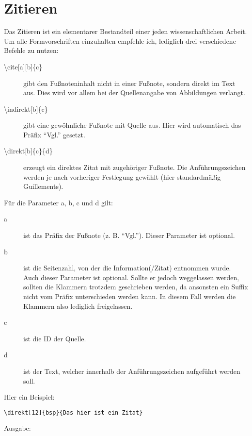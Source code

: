 
\chapter{Zitieren}\label{ch:zitieren}

Das Zitieren ist ein elementarer Bestandteil einer jeden wissenschaftlichen Arbeit. 
Um alle Formvorschriften einzuhalten empfehle ich, lediglich drei verschiedene Befehle zu nutzen:

\begin{description}
	\item[{\textbackslash cite[a][b]\{c\}}] gibt den Fußnoteninhalt nicht in einer Fußnote, sondern direkt im Text aus. Dies wird vor allem bei der Quellenangabe von Abbildungen verlangt.
	\item[{\textbackslash indirekt[b]\{c\}}] gibt eine gewöhnliche Fußnote mit Quelle aus. Hier wird automatisch das Präfix \enquote{Vgl.} gesetzt.
	\item[{\textbackslash direkt[b]\{c\}\{d\}}] erzeugt ein direktes Zitat mit zugehöriger Fußnote. Die Anführungszeichen werden je nach vorheriger Festlegung gewählt (hier standardmäßig Guillements).
\end{description}

Für die Parameter a, b, c und d gilt:

\begin{description}
	\item[a] ist das Präfix der Fußnote (z. B. \enquote{Vgl.}). Dieser Parameter ist optional.
	\item[b] ist die Seitenzahl, von der die Information(/Zitat) entnommen wurde. Auch dieser Parameter ist optional. Sollte er jedoch weggelassen werden, sollten die Klammern trotzdem geschrieben werden, da ansonsten ein Suffix nicht vom Präfix unterschieden werden kann. In diesem Fall werden die Klammern also lediglich freigelassen.
	\item[c] ist die ID der Quelle.
	\item[d] ist der Text, welcher innerhalb der Anführungszeichen aufgeführt werden soll.
\end{description}

Hier ein Beispiel:
\begin{lstlisting}
\direkt[12]{bsp}{Das hier ist ein Zitat}
\end{lstlisting}

Ausgabe: 